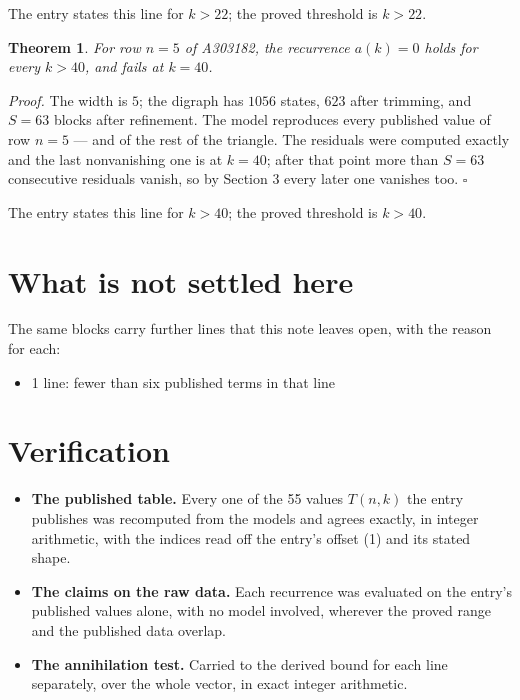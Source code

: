 \documentclass[11pt]{article}
\newtheorem{theorem}{Theorem}
\theoremstyle{definition}
\begin{document}
The entry states this line for $k > 22$; the proved threshold is $k > 22$.

\begin{theorem} For row $n = 5$ of A303182, the recurrence $a(k) = 0$ holds for every $k > 40$, and fails at $k = 40$.\end{theorem}

{\itshape Proof.} The width is $5$; the digraph has $1056$ states, $623$ after trimming, and $S = 63$ blocks after refinement. The model reproduces every published value of row $n = 5$ --- and of the rest of the triangle. The residuals were computed exactly and the last nonvanishing one is at $k = 40$; after that point more than $S = 63$ consecutive residuals vanish, so by Section 3 every later one vanishes too. $\square$

The entry states this line for $k > 40$; the proved threshold is $k > 40$.

\section{What is not settled here}

The same blocks carry further lines that this note leaves open, with the reason for each:

\begin{itemize}

\item 1 line: fewer than six published terms in that line

\end{itemize}

\section{Verification}

\begin{itemize}

\item {\bfseries The published table.} Every one of the 55 values $T(n,k)$ the entry publishes was recomputed from the models and agrees exactly, in integer arithmetic, with the indices read off the entry's offset (1) and its stated shape.

\item {\bfseries The claims on the raw data.} Each recurrence was evaluated on the entry's published values alone, with no model involved, wherever the proved range and the published data overlap.

\item {\bfseries The annihilation test.} Carried to the derived bound for each line separately, over the whole vector, in exact integer arithmetic.

\end{itemize}
\end{document}
